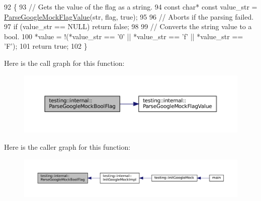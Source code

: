 \begin{DoxyCode}
92                                                  \{
93   \textcolor{comment}{// Gets the value of the flag as a string.}
94   \textcolor{keyword}{const} \textcolor{keywordtype}{char}* \textcolor{keyword}{const} value\_str = \hyperlink{namespacetesting_1_1internal_af9eac3bda47b1fa0b8e43d1d1d3a0b16}{ParseGoogleMockFlagValue}(str, flag, \textcolor{keyword}{true});
95 
96   \textcolor{comment}{// Aborts if the parsing failed.}
97   \textcolor{keywordflow}{if} (value\_str == NULL) \textcolor{keywordflow}{return} \textcolor{keyword}{false};
98 
99   \textcolor{comment}{// Converts the string value to a bool.}
100   *value = !(*value\_str == \textcolor{charliteral}{'0'} || *value\_str == \textcolor{charliteral}{'f'} || *value\_str == \textcolor{charliteral}{'F'});
101   \textcolor{keywordflow}{return} \textcolor{keyword}{true};
102 \}
\end{DoxyCode}
Here is the call graph for this function\+:
\nopagebreak
\begin{figure}[H]
\begin{center}
\leavevmode
\includegraphics[width=350pt]{namespacetesting_1_1internal_a137bff8177d6158f59ab4ce603577293_cgraph}
\end{center}
\end{figure}
Here is the caller graph for this function\+:
\nopagebreak
\begin{figure}[H]
\begin{center}
\leavevmode
\includegraphics[width=350pt]{namespacetesting_1_1internal_a137bff8177d6158f59ab4ce603577293_icgraph}
\end{center}
\end{figure}
\mbox{\label{namespacetesting_1_1internal_af9eac3bda47b1fa0b8e43d1d1d3a0b16}} 
